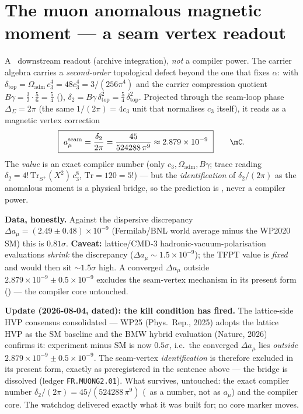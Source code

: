 \documentclass[11pt,a4paper]{article}
\newcommand{\cthree}{c_3}
\begin{document}
\section{The muon anomalous magnetic moment --- a seam vertex readout}
A \mC\ downstream readout (archive integration), \emph{not} a compiler power. The carrier algebra
carries a \emph{second-order} topological defect beyond the one that fixes $\alpha$: with
$\delta_{\mathrm{top}}=\Omega_{\mathrm{adm}}\,\cthree^4=48\cthree^4=3/(256\pi^4)$ and the carrier compression quotient
$B\gamma=\tfrac32\!\cdot\!\tfrac56=\tfrac54$ (),
$\delta_2=B\gamma\,\delta_{\mathrm{top}}^2=\tfrac54\,\delta_{\mathrm{top}}^2$. Projected through the
seam-loop phase $\Delta_\Sigma=2\pi$ (the same $1/(2\pi)=4\cthree$ unit that normalises $\cthree$ itself),
it reads as a magnetic vertex correction
\[
  \boxed{\ a_\mu^{\mathrm{seam}}=\frac{\delta_2}{2\pi}=\frac{45}{524288\,\pi^9}\approx2.879\times10^{-9}\ }\qquad\mC .
\]
The \emph{value} is an exact compiler number (only $\cthree,\Omega_{\mathrm{adm}},B\gamma$; trace reading
$\delta_2=4!\,\mathrm{Tr}_{S^+}(X^2)\,\cthree^8$, $\mathrm{Tr}=120=5!$) --- but the \emph{identification} of
$\delta_2/(2\pi)$ as the anomalous moment is a physical bridge, so the prediction is \mC, never a compiler
power. 

\par\smallskip\noindent\textbf{Data, honestly.} Against the dispersive discrepancy
$\Delta a_\mu=(2.49\pm0.48)\times10^{-9}$ (Fermilab/BNL world average minus the WP2020 SM) this is
$0.81\sigma$. \textbf{Caveat:} lattice/CMD-3 hadronic-vacuum-polarisation evaluations \emph{shrink} the
discrepancy ($\Delta a_\mu\sim1.5\times10^{-9}$); the TFPT value is \emph{fixed} and would then sit
${\sim}1.5\sigma$ high. A converged $\Delta a_\mu$ outside $2.879\times10^{-9}\pm0.5\times10^{-9}$ excludes
the seam-vertex mechanism in its present form (\mX) --- the compiler core untouched.
\par\smallskip\noindent\textbf{Update (2026-08-04, dated): the kill condition has fired.} The
lattice-side HVP consensus consolidated --- WP25 (Phys.\ Rep., 2025) adopts the lattice HVP as the SM
baseline and the BMW hybrid evaluation (Nature, 2026) confirms it: experiment minus SM is now
$0.5\sigma$, i.e.\ the converged $\Delta a_\mu$ lies \emph{outside}
$2.879\times10^{-9}\pm0.5\times10^{-9}$. The seam-vertex \emph{identification} is therefore excluded in
its present form, exactly as preregistered in the sentence above --- the bridge is dissolved
(ledger \texttt{FR.MUONG2.01}). What survives, untouched: the exact compiler number
$\delta_2/(2\pi)=45/(524288\,\pi^9)$ (\mE\ as a number, not as $a_\mu$) and the compiler core. The
watchdog delivered exactly what it was built for; no core marker moves.
\end{document}
